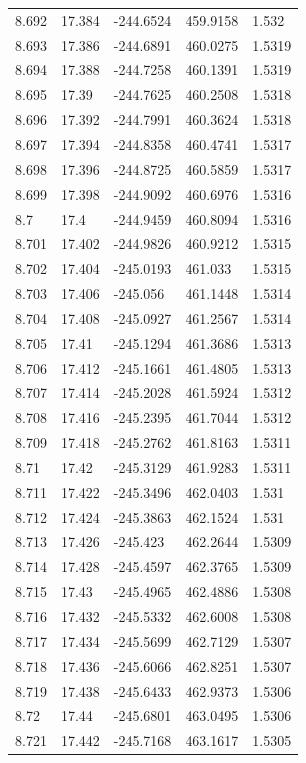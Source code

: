 \begin{tabular}{lllll}
8.692 & 17.384 & -244.6524 & 459.9158 & 1.532 \\
8.693 & 17.386 & -244.6891 & 460.0275 & 1.5319 \\
8.694 & 17.388 & -244.7258 & 460.1391 & 1.5319 \\
8.695 & 17.39 & -244.7625 & 460.2508 & 1.5318 \\
8.696 & 17.392 & -244.7991 & 460.3624 & 1.5318 \\
8.697 & 17.394 & -244.8358 & 460.4741 & 1.5317 \\
8.698 & 17.396 & -244.8725 & 460.5859 & 1.5317 \\
8.699 & 17.398 & -244.9092 & 460.6976 & 1.5316 \\
8.7 & 17.4 & -244.9459 & 460.8094 & 1.5316 \\
8.701 & 17.402 & -244.9826 & 460.9212 & 1.5315 \\
8.702 & 17.404 & -245.0193 & 461.033 & 1.5315 \\
8.703 & 17.406 & -245.056 & 461.1448 & 1.5314 \\
8.704 & 17.408 & -245.0927 & 461.2567 & 1.5314 \\
8.705 & 17.41 & -245.1294 & 461.3686 & 1.5313 \\
8.706 & 17.412 & -245.1661 & 461.4805 & 1.5313 \\
8.707 & 17.414 & -245.2028 & 461.5924 & 1.5312 \\
8.708 & 17.416 & -245.2395 & 461.7044 & 1.5312 \\
8.709 & 17.418 & -245.2762 & 461.8163 & 1.5311 \\
8.71 & 17.42 & -245.3129 & 461.9283 & 1.5311 \\
8.711 & 17.422 & -245.3496 & 462.0403 & 1.531 \\
8.712 & 17.424 & -245.3863 & 462.1524 & 1.531 \\
8.713 & 17.426 & -245.423 & 462.2644 & 1.5309 \\
8.714 & 17.428 & -245.4597 & 462.3765 & 1.5309 \\
8.715 & 17.43 & -245.4965 & 462.4886 & 1.5308 \\
8.716 & 17.432 & -245.5332 & 462.6008 & 1.5308 \\
8.717 & 17.434 & -245.5699 & 462.7129 & 1.5307 \\
8.718 & 17.436 & -245.6066 & 462.8251 & 1.5307 \\
8.719 & 17.438 & -245.6433 & 462.9373 & 1.5306 \\
8.72 & 17.44 & -245.6801 & 463.0495 & 1.5306 \\
8.721 & 17.442 & -245.7168 & 463.1617 & 1.5305 \\

\end{tabular}
